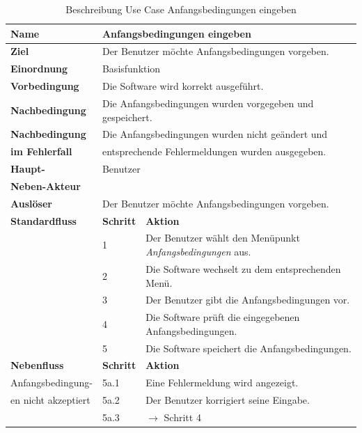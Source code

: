 \begin{table} [H]
	\centering
	\begin{tabular}{|l|l|l|}
		\hline
		\textbf{Name} 			& \multicolumn{2}{|l|}{Anfangsbedingungen eingeben}  \\
		\hline
		\textbf{Ziel} 			& \multicolumn{2}{|l|}{Der Benutzer möchte Anfangsbedingungen vorgeben. }\\ 
		\hline
		\textbf{Einordnung}		& \multicolumn{2}{|l|}{Basisfunktion}\\
		\hline
		\textbf{Vorbedingung}	& \multicolumn{2}{|l|}{Die Software wird korrekt ausgeführt.} \\
		\hline
		\textbf{Nachbedingung}	& \multicolumn{2}{|l|}{Die Anfangsbedingungen wurden vorgegeben und gespeichert.}\\
		\hline
		\textbf{Nachbedingung} 	& \multicolumn{2}{|l|}{Die Anfangsbedingungen wurden nicht geändert und}\\
		\textbf{im Fehlerfall}	& \multicolumn{2}{|l|}{entsprechende Fehlermeldungen wurden ausgegeben.}\\
		\hline
		\textbf{Haupt-} 			& \multicolumn{2}{|l|}{Benutzer}\\
		\textbf{Neben-Akteur}	& \multicolumn{2}{|l|}{	}			\\
		\hline
		\textbf{Auslöser} 		& \multicolumn{2}{|l|}{Der Benutzer möchte Anfangsbedingungen vorgeben.} \\
		\hline 
		\textbf{Standardfluss} & \textbf{Schritt} & \textbf{Aktion} \\
		\hline
		&	1	& Der Benutzer wählt den Menüpunkt \emph{Anfangsbedingungen} aus. \\
		\cline{2-3}
		&	2	& Die Software wechselt zu dem entsprechenden Menü.\\
		\cline{2-3}
		&	3	& Der Benutzer gibt die Anfangsbedingungen vor.\\
		\cline{2-3}
		&	4	& Die Software prüft die eingegebenen Anfangsbedingungen.\\
		\cline{2-3}
		&	5	& Die Software speichert die Anfangsbedingungen.\\
		\hline
		\textbf{Nebenfluss} & \textbf{Schritt} & \textbf{Aktion}\\
		\hline
		Anfangsbedingung-  & 5a.1 & Eine Fehlermeldung wird angezeigt.\\
		\cline{2-3}
		en nicht akzeptiert 	& 5a.2	& Der Benutzer korrigiert seine Eingabe.\\
		\cline{2-3}
					& 5a.3 	& $\rightarrow$ Schritt 4\\
		\hline
	\end{tabular}
	\caption{Beschreibung Use Case Anfangsbedingungen eingeben}
	\label{Beschreibung Use Case Anfangsbedingungen eingeben}
\end{table}

